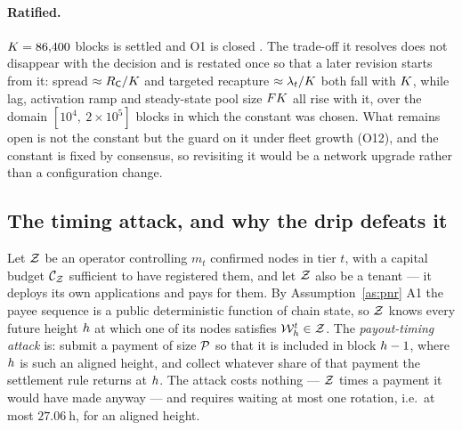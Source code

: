 \paragraph{Ratified.} $K = 86{,}400$ blocks is settled and O1 is closed
. The trade-off it resolves does not disappear with
the decision and is restated once so that a later revision starts from it: spread
$\approx R_{\mathsf{C}}/K$ and targeted recapture $\approx \lambda_{t}/K$ both fall with
$K$, while lag, activation ramp and steady-state pool size $FK$ all rise with it, over the
domain $[10^{4},\ 2\times10^{5}]$ blocks in which the constant was chosen. What remains open is not
the constant but the guard on it under fleet growth (O12), and the constant is fixed by consensus,
so revisiting it would be a network upgrade rather than a configuration change.


\subsection{The timing attack, and why the drip defeats it}
\label{sec:pnr:timing}

\begin{definition}
\label{def:pnr:attack}
Let $\mathcal{Z}$ be an operator controlling $m_t$ confirmed nodes in tier $t$, with a capital budget
$\mathcal{C}_{\mathcal{Z}}$ sufficient to have registered them, and let $\mathcal{Z}$ also be a tenant --- it deploys its
own applications and pays for them. By Assumption~\ref{as:pnr} A1 the payee sequence is a public
deterministic function of chain state, so $\mathcal{Z}$ knows every future height $h$ at which one of its
nodes satisfies $\mathcal{W}_{h}^{t} \in \mathcal{Z}$. The \emph{payout-timing attack} is: submit a payment of
size $\mathcal{P}$ so that it is included in block $h - 1$, where $h$ is such an aligned height, and
collect whatever share of that payment the settlement rule returns at $h$. The attack costs
nothing --- $\mathcal{Z}$ times a payment it would have made anyway --- and requires waiting at most one
rotation, i.e.\ at most $\SI{27.06}{\hour}$, for an aligned height.
\end{definition}

